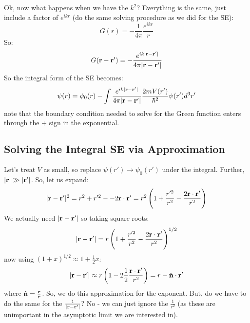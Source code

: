 Ok, now what happens when we have the $k^2$? Everything is the same, just include a factor of $e^{ikr}$ (do the same solving procedure as we did for the SE):
\begin{equation}
    G(r) = -\frac{1}{4\pi}\frac{e^{ikr}}{r}
\end{equation}
So:
\begin{equation}
    G(\mathbf{r} - \mathbf{r}') = -\frac{e^{ik\lvert \mathbf{r} - \mathbf{r}' \rvert}}{4\pi\lvert \mathbf{r} - \mathbf{r}' \rvert}
\end{equation}
So the integral form of the SE becomes:
\begin{equation}
    \psi(r) = \psi_0(r) - \int \frac{e^{ik\lvert \mathbf{r} - \mathbf{r}' \rvert}}{4\pi\lvert \mathbf{r} - \mathbf{r}' \rvert} \frac{2mV(r')}{\hbar^2}\psi(r')d^3r'
\end{equation}
note that the boundary condition needed to solve for the Green function enters through the $+$ sign in the exponential.

\subsection{Solving the Integral SE via Approximation}
Let's treat $V$ as small, so replace $\psi(r') \to \psi_0(r')$ under the integral. Further, $\lvert \mathbf{r} \rvert \gg \lvert \mathbf{r}' \rvert$. So, let us expand:
\begin{equation}
    \lvert \mathbf{r} - \mathbf{r}' \rvert^2 = r^2 + r'^2 - -2\mathbf{r} \cdot \mathbf{r}'  = r^2\left(1 + \frac{r'^2}{r^2} - \frac{2\mathbf{r} \cdot \mathbf{r}'}{r^2}\right)
\end{equation}
We actually need $\lvert \mathbf{r} - \mathbf{r}' \rvert$ so taking square roots:
\begin{equation}
    \lvert \mathbf{r} - \mathbf{r}' \rvert = r\left(1 + \frac{r'^2}{r^2} - \frac{2\mathbf{r}\cdot\mathbf{r}'}{r^2}\right)^{1/2}
\end{equation}
now using $(1+x)^{1/2} \approx 1 + \frac{1}{2}x$:
\begin{equation}
    \lvert \mathbf{r} - \mathbf{r}' \rvert \approx r\left(1 - 2\frac{1}{2}\frac{\mathbf{r} \cdot \mathbf{r}'}{r^2}\right) = r - \hat{\mathbf{n}} \cdot \mathbf{r}'
\end{equation}
where $\hat{\mathbf{n}} = \frac{\mathbf{r}}{r}$. So, we do this approximation for the exponent. But, do we have to do the same for the $\frac{1}{\lvert \mathbf{r} - \mathbf{r}' \rvert}$? No - we can just ignore the $\frac{1}{r^2}$ (as these are unimportant in the asymptotic limit we are interested in).

